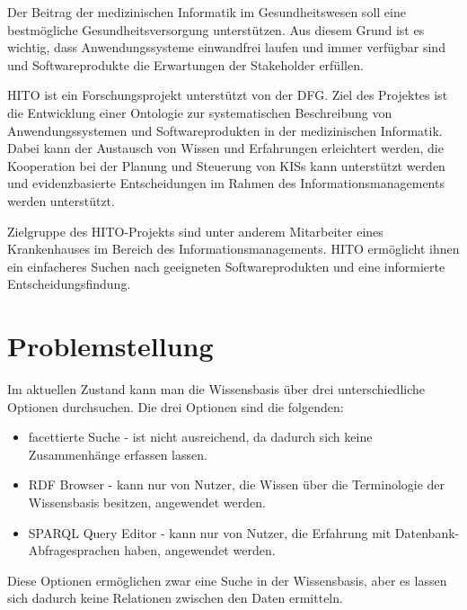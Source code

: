 
Der Beitrag der medizinischen Informatik im Gesundheitswesen soll eine bestmögliche Gesundheitsversorgung unterstützen.
Aus diesem Grund ist es wichtig, dass Anwendungssysteme einwandfrei laufen und immer verfügbar sind und Softwareprodukte die Erwartungen der Stakeholder erfüllen.

\ac{HITO} ist ein Forschungsprojekt unterstützt von der \ac{DFG}.
Ziel des Projektes ist die Entwicklung einer Ontologie zur systematischen Beschreibung von Anwendungssystemen und Softwareprodukten in der medizinischen Informatik.
Dabei kann der Austausch von Wissen und Erfahrungen erleichtert werden, die Kooperation bei der Planung und Steuerung von \acp{KIS} kann unterstützt werden und evidenzbasierte Entscheidungen im Rahmen des Informationsmanagements werden unterstützt.

Zielgruppe des HITO-Projekts sind unter anderem Mitarbeiter eines Krankenhauses im Bereich des Informationsmanagements. HITO ermöglicht ihnen ein einfacheres Suchen nach geeigneten Softwareprodukten und eine informierte Entscheidungsfindung.

\section{Problemstellung}\label{sec:problemstellung}


Im aktuellen Zustand kann man die Wissensbasis über drei unterschiedliche Optionen durchsuchen.
Die drei Optionen sind die folgenden:
\begin{itemize}
\item facettierte Suche - ist nicht ausreichend, da dadurch sich keine Zusammenhänge erfassen lassen.
\item RDF Browser - kann nur von Nutzer, die Wissen über die Terminologie der Wissensbasis besitzen, angewendet werden.
\item SPARQL Query Editor - kann nur von Nutzer, die Erfahrung mit Datenbank-Abfragesprachen haben, angewendet werden.
\end{itemize} 
Diese Optionen ermöglichen zwar eine Suche in der Wissensbasis, aber es lassen sich dadurch keine Relationen zwischen den Daten ermitteln.

